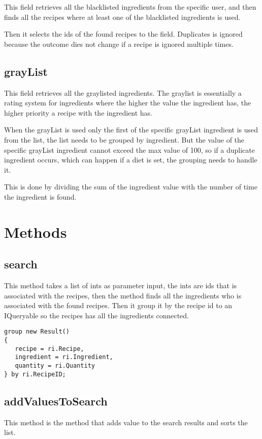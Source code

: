 This field retrieves all the blacklisted ingredients from the specific user, and then finds all the recipes where at least one of the blacklisted ingredients is used.

Then it selects the ids of the found recipes to the field. Duplicates is ignored because the outcome dies not change if a recipe is ignored multiple times.

\subsection{grayList}\label{ssc:graylist}
This field retrieves all the graylisted ingredients. The graylist is essentially a rating system for ingredients where the higher the value the ingredient has, the higher priority a recipe with the ingredient has.

When the grayList is used only the first of the specific grayList ingredient is used from the list, the list needs to be grouped by ingredient. But the value of the specific grayList ingredient cannot exceed the max value of 100, so if a duplicate ingredient occurs, which can happen if a diet is set, the grouping needs to handle it. 

This is done by dividing the sum of the ingredient value with the number of time the ingredient is found. 

\section{Methods}
\subsection{search}
This method takes a list of ints as parameter input, the ints are ids that is associated with the recipes, then the method finds all the ingredients who is associated with the found recipes. Then it group it by the recipe id to an IQueryable so the recipes has all the ingredients connected.

\begin{lstlisting}[caption=ResultGrouping, label={lst:ResultGrouping}, language=CSharp]
group new Result()
{
   recipe = ri.Recipe,
   ingredient = ri.Ingredient,
   quantity = ri.Quantity
} by ri.RecipeID;
\end{lstlisting}

\subsection{addValuesToSearch}
This method is the method that adds value to the search results and sorts the list.

